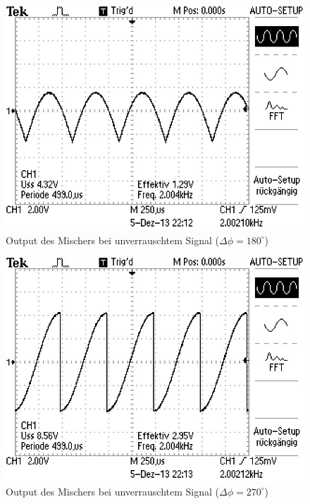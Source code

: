 \documentclass[11pt]{article}
\begin{document}
\begin{figure}[h]
\centering
\includegraphics[scale=0.85]{Bilder/5-sine-180.png}
\caption{Output des Mischers bei unverrauschtem Signal ($\Delta\phi=180^\circ$)}
\label{Abb9}
\end{figure}

\begin{figure}[h]
\centering
\includegraphics[scale=0.85]{Bilder/5-sine-270.png}
\caption{Output des Mischers bei unverrauschtem Signal ($\Delta\phi=270^\circ$)}
\label{Abb10}
\end{figure}
\end{document}
